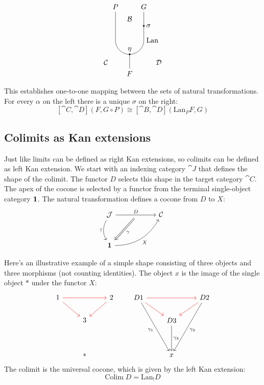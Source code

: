 \documentclass[DaoFP]{subfiles}
\begin{document}
\[\begin{tikzpicture}
\draw (\xb, \ya) to (\xb, \yc) to [out=270, in=180]  (\xc, \yd) to  [out=0, in=270] (\xd, \yc) to (\xd, \ya);
\draw (\xc, \yd) -- (\xc, \ye);

\filldraw[black] (\xc, \yd) circle (1 pt);
\node [above] at (\xc, \yd) {$\eta$};

\filldraw[black] (\xd, \yb) circle (1 pt);
\node [right] at (\xd, \yb) {$\sigma$};

\node[right] at (\xa, \ye + 0.3) {$\mathcal{C}$};
\node[left] at (\xe, \ye + 0.3) {$\mathcal{D}$};
\node[above] at (\xc, \ya - 0.6) {$\mathcal{B}$};
\node [above] at (\xb, \ya) {$P$};
\node [above] at (\xd, \ya) {$G$};
\node [below] at (\xc, \ye) {$F$};
\node [right] at (\xd, \yc) {$\text{Lan}$};

\end{tikzpicture}
\]

This establishes one-to-one mapping between the sets of natural transformations. For every $\alpha$ on the left there is a unique $\sigma$ on the right:
\[  [\cat C, \cat D] (F, G \circ P) \cong [\cat B, \cat D](\text{Lan}_P F , G)  \]

\subsection{Colimits as Kan extensions}

Just like limits can be defined as right Kan extensions, so colimits can be defined as left Kan extension. We start with an indexing category $\cat J$ that defines the shape of the colimit. The functor $D$ selects this shape in the target category $\cat C$. The apex of the cocone is selected by a functor from the terminal single-object category $\mathbf{1}$. The natural transformation defines a cocone from $D$ to $X$:
\[
 \begin{tikzcd} [row sep=1cm, column sep=1cm]
 \cat J
 \arrow[rr, "D", "" {name=ID, below} ]
 \arrow[d, bend right, "!"']
 && \cat C
 \\
 \Cat 1
  \arrow[urr, bend right, "X"']
 \arrow[Rightarrow, "\gamma",  from=ID]
 \end{tikzcd}
\]

Here's an illustrative example of a simple shape consisting of three objects and three morphisms (not counting identities). The object $x$ is the image of the single object $*$ under the functor $X$:
\[
 \begin{tikzcd}
1 
\arrow[rr, red]
\arrow[rd, red]
&& 2
\arrow[dl, red]
\\
& 3
\\
\\
& *
 \end{tikzcd}
 \qquad
 \begin{tikzcd}
D 1 
\arrow[rr, red]
\arrow[rd, red]
\arrow[dddr, "\gamma_1"']
&& D 2
\arrow[dl, red]
\arrow[dddl, "\gamma_2"]
\\
& D 3
\arrow[dd, "\gamma_3"]
\\
\\
&x
 \end{tikzcd}
 \]
The colimit is the universal cocone, which is given by the left Kan extension:
\[ \text{Colim}\; D = \text{Lan}_! D \]
\end{document}
